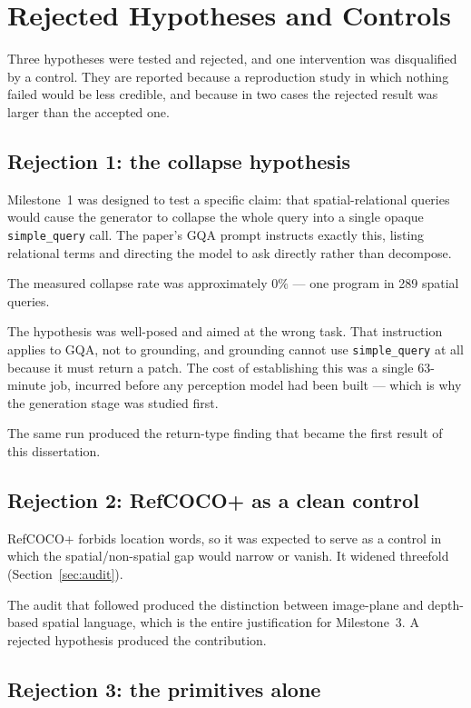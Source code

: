 \documentclass[12pt,a4paper,oneside]{report}
\begin{document}
\chapter{Rejected Hypotheses and Controls}
\label{ch:rejected}

Three hypotheses were tested and rejected, and one intervention was disqualified by a
control. They are reported because a reproduction study in which nothing failed would be
less credible, and because in two cases the rejected result was larger than the accepted
one.

\section{Rejection 1: the collapse hypothesis}

Milestone~1 was designed to test a specific claim: that spatial-relational queries would
cause the generator to collapse the whole query into a single opaque
\texttt{simple\_query} call. The paper's GQA prompt instructs exactly this, listing
relational terms and directing the model to ask directly rather than decompose.

The measured collapse rate was approximately $0\%$ --- one program in 289 spatial queries.

The hypothesis was well-posed and aimed at the wrong task. That instruction applies to
GQA, not to grounding, and grounding cannot use \texttt{simple\_query} at all because it
must return a patch. The cost of establishing this was a single 63-minute job, incurred
before any perception model had been built --- which is why the generation stage was
studied first.

The same run produced the return-type finding that became the first result of this
dissertation.

\section{Rejection 2: RefCOCO+ as a clean control}

RefCOCO+ forbids location words, so it was expected to serve as a control in which the
spatial/non-spatial gap would narrow or vanish. It widened threefold
(Section~\ref{sec:audit}).

The audit that followed produced the distinction between image-plane and depth-based
spatial language, which is the entire justification for Milestone~3. A rejected
hypothesis produced the contribution.

\section{Rejection 3: the primitives alone}
\end{document}

